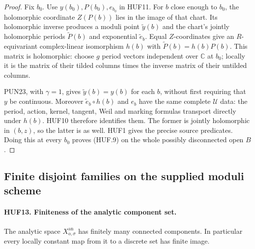 \documentclass[11pt,a4paper]{article}
\numberwithin{equation}{section}
\theoremstyle{remark}\newtheorem{remark}[theorem]{Remark}
\begin{document}
\begin{proof}
Fix \(b_0\).  Use \(y(b_0),P(b_0),e_{b_0}\) in HUF11.
For \(b\) close enough to \(b_0\), the holomorphic
coordinate \(Z(P(b))\) lies in the image of that chart.
Its holomorphic inverse produces a moduli point
\(\widetilde y(b)\) and the chart's jointly
holomorphic periods \(\widetilde P(b)\) and exponential
\(\widetilde e_b\).  Equal \(Z\)-coordinates give
an \(R\)-equivariant complex-linear isomorphism
\(h(b)\) with
\(\widetilde P(b)=h(b)P(b)\).
This matrix is holomorphic: choose \(g\) period
vectors independent over \(\mathbb C\) at \(b_0\);
locally it is the matrix of their tilded columns
times the inverse matrix of their untilded columns.

PUN23, with \(\gamma=1\), gives
\(\widetilde y(b)=y(b)\) for each \(b\), without
first requiring that \(y\) be continuous.
Moreover \(\widetilde e_b\circ h(b)\) and \(e_b\)
have the same complete \(\mathcal U\) data:
the period, action, kernel, tangent, Weil and
marking formulas transport directly under \(h(b)\).
HUF10 therefore identifies them.  The former is
jointly holomorphic in \((b,z)\), so the latter is
as well.  HUF1 gives the precise source predicates.
Doing this at every \(b_0\) proves (HUF.9) on
the whole possibly disconnected open \(B\).
\end{proof}

\subsection{Finite disjoint families on the supplied moduli scheme}

\paragraph{HUF13. Finiteness of the analytic component set.}
\label{claim:HUF13}
The analytic space \(X_{o,\sigma}^{\mathrm{an}}\) has
finitely many connected components.  In particular every
locally constant map from it to a discrete set has finite
image.
\end{document}
